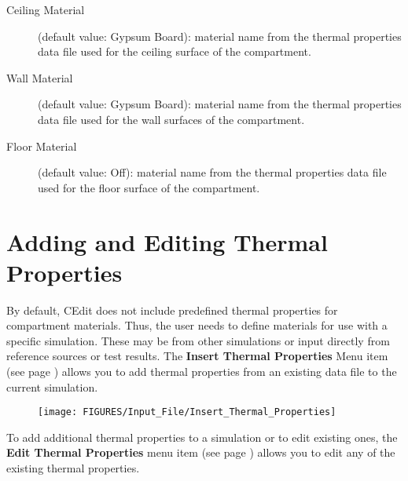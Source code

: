 \begin{description}
\item[Ceiling Material] (default value: Gypsum Board): material name from the thermal properties data file used for the ceiling surface of the compartment.

\item[Wall Material] (default value: Gypsum Board): material name from the thermal properties data file used for the wall surfaces of the compartment.

\item[Floor Material] (default value: Off): material name from the thermal properties data file used for the floor surface of the compartment.
    \end{description}


\section{Adding and Editing Thermal Properties}

By default, CEdit does not include predefined thermal properties for compartment materials. Thus, the user needs to define materials for use with a specific simulation.  These may be from other simulations or input directly from reference sources or test results. The \textbf{Insert Thermal Properties} Menu item (see page \pageref{Thermal_Properties_Menu}) allows you to add thermal properties from an existing data file to the current simulation.

\begin{figure}[h!]
\begin{center}
\texttt{[image: FIGURES/Input\_File/Insert\_Thermal\_Properties]}
\end{center}
\end{figure}

To add additional thermal properties to a simulation or to edit existing ones, the \textbf{Edit Thermal Properties} menu item (see page \pageref{Thermal_Properties_Menu}) allows you to edit any of the existing thermal properties. \\~ \\

